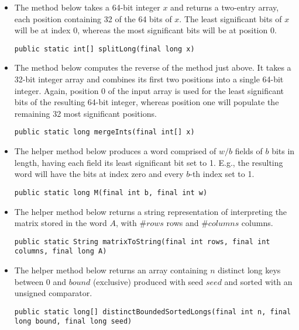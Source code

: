\begin{itemize}
    \item
    The method below takes a 64-bit integer $x$ and returns a two-entry array, each position containing 32 of the 64 bits of $x$. The least significant bits of $x$ will be at index 0, whereas the most significant bits will be at position 0.
    \begin{lstlisting}
public static int[] splitLong(final long x)
    \end{lstlisting}
    
    \item
    The method below computes the reverse of the method just above. It takes a 32-bit integer array and combines its first two positions into a single 64-bit integer. Again, position 0 of the input array is used for the least significant bits of the resulting 64-bit integer, whereas position one will populate the remaining 32 most significant positions.
    \begin{lstlisting}
public static long mergeInts(final int[] x)
    \end{lstlisting}
    
    \item
    The helper method below produces a word comprised of $w / b$ fields of $b$ bits in length, having each field its least significant bit set to 1. E.g., the resulting word will have the bits at index zero and every $b$-th index set to 1.
    \begin{lstlisting}
public static long M(final int b, final int w)
    \end{lstlisting}

    \item
    The helper method below returns a string representation of interpreting the matrix stored in the word $A$, with $\#rows$ rows and $\#columns$ columns.
    \begin{lstlisting}
public static String matrixToString(final int rows, final int columns, final long A)
    \end{lstlisting}
    
    \item
    The helper method below returns an array containing $n$ distinct {\ttfamily long} keys between 0 and $bound$ (exclusive) produced with seed $seed$ and sorted with an unsigned comparator.
    \begin{lstlisting}
public static long[] distinctBoundedSortedLongs(final int n, final long bound, final long seed)
    \end{lstlisting}
    

\end{itemize}
